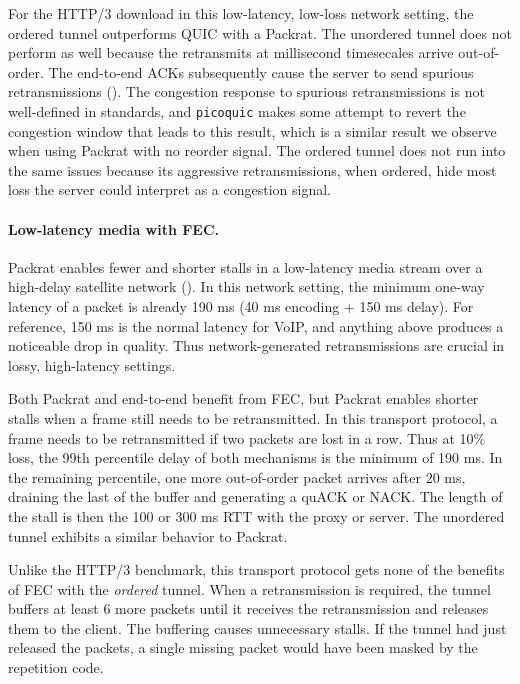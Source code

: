 

For the HTTP/3 download in this low-latency, low-loss network setting, the
ordered tunnel outperforms QUIC with a Packrat. The unordered tunnel does not
perform as well because the retransmits at millisecond timesecales arrive
out-of-order. The end-to-end ACKs subsequently cause the server to send
spurious retransmissions (). The congestion response to
spurious retransmissions is not well-defined in standards, and \texttt
{picoquic} makes some attempt to revert the congestion window that leads to
this result, which is a similar result we observe when using Packrat with no
reorder signal. The ordered tunnel does not run into the same issues because
its aggressive retransmissions, when ordered, hide most loss the server could
interpret as a congestion signal.

\paragraph{Low-latency media with FEC.}

Packrat enables fewer and shorter stalls in a low-latency media stream over a
high-delay satellite network (). In this network setting,
the minimum one-way latency of a packet is already 190 ms (40 ms encoding + 150
ms delay). For reference, 150 ms is the normal latency for VoIP, and anything
above produces a noticeable drop in quality. Thus network-generated
retransmissions are crucial in lossy, high-latency settings.

Both Packrat and end-to-end benefit from FEC, but Packrat enables shorter stalls when
a frame still needs to be retransmitted. In this transport protocol, a frame
needs to be retransmitted if two packets are lost in a row. Thus at 10\% loss,
the 99th percentile delay of both mechanisms is the minimum of 190 ms. In the
remaining percentile, one more out-of-order packet arrives after $20$ ms,
draining the last of the buffer and generating a quACK or NACK. The length of
the stall is then the 100 or 300 ms RTT with the proxy or server. The unordered
tunnel exhibits a similar behavior to Packrat.

Unlike the HTTP/3 benchmark, this transport protocol gets none of the benefits
of FEC with the \textit{ordered} tunnel. When a retransmission is required, the
tunnel buffers at least 6 more packets until it receives the retransmission and
releases them to the client. The buffering causes unnecessary stalls. If the
tunnel had just released the packets, a single missing packet would have been
masked by the repetition code.


